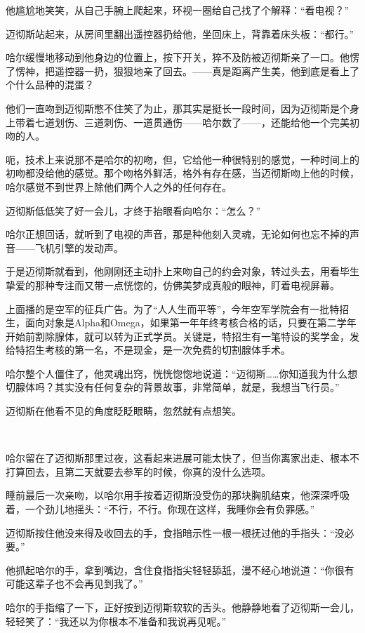 \documentclass[../main]{subfiles}
\begin{document}
他尴尬地笑笑，从自己手腕上爬起来，环视一圈给自己找了个解释：“看电视？”

迈彻斯站起来，从房间里翻出遥控器扔给他，坐回床上，背靠着床头板：“都行。”

哈尔缓慢地移动到他身边的位置上，按下开关，猝不及防被迈彻斯亲了一口。他愣了愣神，把遥控器一扔，狠狠地亲了回去。——真是距离产生美，他到底是看上了个什么品种的混蛋？

他们一直吻到迈彻斯憋不住笑了为止，那其实是挺长一段时间，因为迈彻斯是个身上带着七道划伤、三道刺伤、一道贯通伤——哈尔数了——，还能给他一个完美初吻的人。

呃，技术上来说那不是哈尔的初吻，但，它给他一种很特别的感觉，一种时间上的初吻都没给他的感觉。那个吻格外鲜活，格外有存在感，当迈彻斯吻上他的时候，哈尔感觉不到世界上除他们两个人之外的任何存在。

迈彻斯低低笑了好一会儿，才终于抬眼看向哈尔：“怎么？”

哈尔正想回话，就听到了电视的声音，那是种他刻入灵魂，无论如何也忘不掉的声音——飞机引擎的发动声。

于是迈彻斯就看到，他刚刚还主动扑上来吻自己的约会对象，转过头去，用看毕生挚爱的那种专注而又带一点恍惚的，仿佛美梦成真般的眼神，盯着电视屏幕。

上面播的是空军的征兵广告。为了“人人生而平等”，今年空军学院会有一批特招生，面向对象是Alpha和Omega，如果第一年年终考核合格的话，只要在第二学年开始前割除腺体，就可以转为正式学员。关键是，特招生有一笔特设的奖学金，发给特招生考核的第一名，不是现金，是一次免费的切割腺体手术。

哈尔整个人僵住了，他灵魂出窍，恍恍惚惚地说道：“迈彻斯……你知道我为什么想切腺体吗？其实没有任何复杂的背景故事，非常简单，就是，我想当飞行员。”

迈彻斯在他看不见的角度眨眨眼睛，忽然就有点想笑。

~\

哈尔留在了迈彻斯那里过夜，这看起来进展可能太快了，但当你离家出走、根本不打算回去，且第二天就要去参军的时候，你真的没什么选项。

睡前最后一次亲吻，以哈尔用手按着迈彻斯没受伤的那块胸肌结束，他深深呼吸着，一个劲儿地摇头：“不行，不行。你现在这样，我睡你会有负罪感。”

迈彻斯按住他没来得及收回去的手，食指暗示性一根一根抚过他的手指头：“没必要。”

他抓起哈尔的手，拿到嘴边，含住食指指尖轻轻舔舐，漫不经心地说道：“你很有可能这辈子也不会再见到我了。”

哈尔的手指缩了一下，正好按到迈彻斯软软的舌头。他静静地看了迈彻斯一会儿，轻轻笑了：“我还以为你根本不准备和我说再见呢。”
\end{document}
